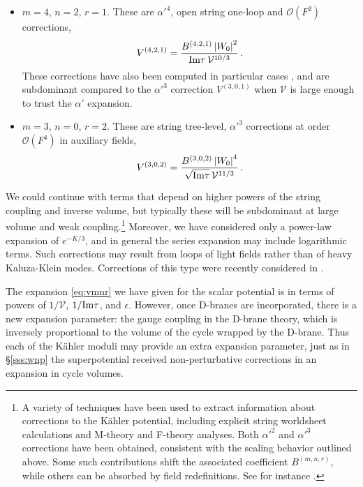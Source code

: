 \documentclass[12pt,a4wide]{article}
\def\O{\mathcal{O}}
\def\V{\mathcal{V}}
\def\be{\begin{equation}}
\def\ee{\end{equation}}
\begin{document}
\begin{itemize}
\item 
$m=4$, $n=2$, $r=1$. These are $\alpha'^4$, open string one-loop and $\O(F^2)$ corrections,
\be
V^{(4,2,1)}=\frac{B^{(4,2,1)} \left | W_0\right |^2}{{\hbox{Im}\tau} \, \V^{10/3}}\,.
\ee
These corrections have also been computed in particular cases \cite{Berg:2005ja}, and are subdominant compared to the $\alpha'^3$ correction  $V^{(3,0,1)}$ when $\V$ is large enough to trust the $\alpha'$ expansion.

\item 
$m=3$, $n=0$, $r=2$. These are string tree-level, $\alpha'^3$ corrections at order $\O(F^4)$ in auxiliary fields,
\be
V^{(3,0,2)}=\frac{B^{(3,0,2)} \left | W_0\right |^4}{\sqrt{\hbox{Im}\tau} \, \V^{11/3}}\,.
\ee
\end{itemize}

We could continue with terms that depend on higher powers of the string coupling and inverse volume, but typically these will be  subdominant at large volume and weak coupling.\footnote{A variety of techniques have been used to extract information about corrections to the K\"ahler potential, including explicit string worldsheet calculations and M-theory and F-theory analyses. Both $\alpha'^2$ and $\alpha'^3$ corrections have been obtained, consistent with the scaling behavior outlined above. Some such contributions shift the associated coefficient $B^{(m,n,r)}$, while others can
be absorbed by field redefinitions. See for instance \cite{Halverson:2013qca,Grimm:2013gma,Grimm:2013bha,Junghans:2014zla,Minasian:2015bxa,Haack:2018ufg}.}  Moreover, we have considered only a power-law expansion of $e^{-K/3}$, and in general the series expansion may include logarithmic terms.  Such corrections may result  from loops of light fields rather than of heavy Kaluza-Klein modes. Corrections of this type were recently considered in \cite{Conlon:2010ji, Grimm:2017pid, Weissenbacher:2019mef, Antoniadis:2019rkh,Klaewer:2020lfg,Burgess:2022nbx}.
 
The expansion  \eqref{eq:vmnr} we have given for the scalar potential is in terms of powers of $1/\V$, $1/\hbox{Im}\tau$, and $\epsilon$. 
However, once D-branes are incorporated, there is a new expansion parameter: 
the gauge coupling in the D-brane theory, which is inversely proportional to the volume of the cycle wrapped by  the D-brane.
Thus each of the K\"ahler moduli may provide an extra expansion parameter, just as 
in \S\ref{sss:wnp} the superpotential received non-perturbative corrections in an expansion in cycle volumes.
\end{document}
